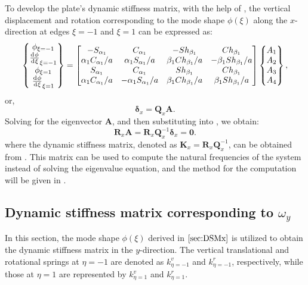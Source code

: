 \documentclass[preprint,12pt,number]{elsarticle}
\newcommand{\id}{\mathrm{d}\mkern1mu}
\begin{document}
To develop the plate's dynamic stiffness matrix, with the help of , the vertical displacement and rotation corresponding to the mode shape $\phi(\xi)$ along the $x$-direction at edges $\xi = -1$ and $\xi = 1$ can be expressed as:
%
\begin{equation}\label{eq:UBx}
\begin{split}
	\begin{Bmatrix}
		\phi_{\xi=-1}\\\frac{\id \phi}{\id \xi}_{\xi=-1}\\\phi_{\xi=1}\\\frac{\id \phi}{\id \xi}_{\xi=1}
	\end{Bmatrix}
	= \begin{bmatrix}
		-S_{\alpha_1}&C_{\alpha_1}&-Sh_{\beta_1}&Ch_{\beta_1}\\
		\alpha_1 C_{\alpha_1}/a&\alpha_1S_{\alpha_1}/a&\beta_1Ch_{\beta_1}/a&-\beta_1Sh_{\beta_1}/a\\
		S_{\alpha_1}&C_{\alpha_1}&Sh_{\beta_1}&Ch_{\beta_1}\\
		\alpha_1 C_{\alpha_1}/a&-\alpha_1S_{\alpha_1}/a&\beta_1Ch_{\beta_1}/a&\beta_1Sh_{\beta_1}/a
	\end{bmatrix}
	\begin{Bmatrix}
		A_1\\A_2\\A_3\\A_4
	\end{Bmatrix} ,
\end{split}
\end{equation}
%
or,
%
\begin{equation}\label{eq:UBx1}
\mathbf{\delta}_x= \mathbf{Q}_x\mathbf{A}.
\end{equation}
%
Solving for the eigenvector $\mathbf{A}$, and then substituting into , we obtain:
%
\begin{equation}\label{eq:DSM_eqx}
\mathbf{R}_x \mathbf{A}=\mathbf{R}_x\mathbf{Q}_x^{-1}\mathbf{\delta}_x = \mathbf{0}.
\end{equation}
%
where the dynamic stiffness matrix, denoted as $\mathbf{K}_x = \mathbf{R}_x\mathbf{Q}_x^{-1}$, can be obtained from . 
This matrix can be used to compute the natural frequencies of the system instead of solving the eigenvalue equation, 
and the method for the computation will be given in .

\subsection{Dynamic stiffness matrix corresponding to $\omega_y$}\label{sec:DSMy}
In this section, the mode shape $\phi(\xi)$ derived in $\Cref{sec:DSMx}$ is utilized to obtain the dynamic stiffness matrix in the $y$-direction.  
The vertical translational and rotational springs at $\eta = -1$ are denoted as $k^v_{\eta = -1}$ and $k^r_{\eta = -1}$, respectively, while those at $\eta = 1$ are represented by $k^v_{\eta = 1}$ and $k^r_{\eta = 1}$.
\end{document}

